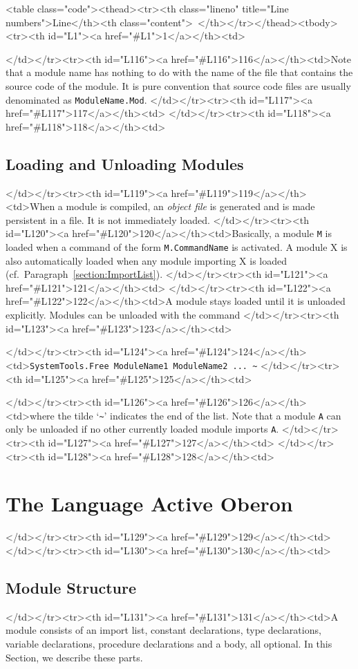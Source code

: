 <table class="code"><thead><tr><th class="lineno" title="Line numbers">Line</th><th class="content"> </th></tr></thead><tbody><tr><th id="L1"><a href="#L1">1</a></th><td>\documentclass[a4paper,11pt]{article}
\begin{document}
</td></tr><tr><th id="L116"><a href="#L116">116</a></th><td>Note that a module name has nothing to do with the name of the file that contains the source code of the module. It is pure convention that source code files are usually denominated as \verb+ModuleName.Mod+.
</td></tr><tr><th id="L117"><a href="#L117">117</a></th><td>
</td></tr><tr><th id="L118"><a href="#L118">118</a></th><td>\subsection{Loading and Unloading Modules}\label{section:LoadingAndUnloadingModules}
</td></tr><tr><th id="L119"><a href="#L119">119</a></th><td>When a module is compiled, an {\em object file} is generated and is made persistent in a file. It is not immediately loaded.
</td></tr><tr><th id="L120"><a href="#L120">120</a></th><td>Basically, a module \verb+M+ is loaded when a command of the form \verb+M.CommandName+ is activated. A module X is also automatically loaded when any module importing X is loaded (cf.~Paragraph~\ref{section:ImportList}).
</td></tr><tr><th id="L121"><a href="#L121">121</a></th><td>
</td></tr><tr><th id="L122"><a href="#L122">122</a></th><td>A module stays loaded until it is unloaded explicitly. Modules can be unloaded with the command
</td></tr><tr><th id="L123"><a href="#L123">123</a></th><td>\begin{center}
</td></tr><tr><th id="L124"><a href="#L124">124</a></th><td>\verb+SystemTools.Free ModuleName1 ModuleName2 ... ~+
</td></tr><tr><th id="L125"><a href="#L125">125</a></th><td>\end{center}
</td></tr><tr><th id="L126"><a href="#L126">126</a></th><td>where the tilde `\verb+~+' indicates the end of the list. Note that a module \verb+A+ can only be unloaded if no other currently loaded module imports \verb+A+.
</td></tr><tr><th id="L127"><a href="#L127">127</a></th><td>
</td></tr><tr><th id="L128"><a href="#L128">128</a></th><td>\section{The Language Active Oberon}\label{section:TheLanguageActiveOberon}
</td></tr><tr><th id="L129"><a href="#L129">129</a></th><td>
</td></tr><tr><th id="L130"><a href="#L130">130</a></th><td>\subsection{Module Structure}
</td></tr><tr><th id="L131"><a href="#L131">131</a></th><td>A module consists of an import list, constant declarations, type declarations, variable declarations, procedure declarations and a body, all optional. In this Section, we describe these parts.
\end{document}
